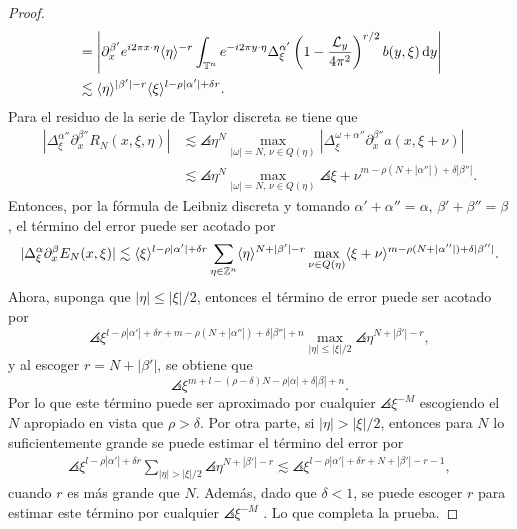 \begin{proof}
\begin{align*}
		& =  \left|\partial^{\beta'}_x  e^{i2\pi x\cdot\eta}\langle\eta\rangle^{-r}  \int_{\mathbb{T}^n} e^{-i2\pi y\cdot\eta}\Delta^{\alpha'}_\xi\left(1-\frac{\mathcal{L}_y}{4\pi^2}\right)^{r/2} b(y, \xi) \mathop{}\!\mathrm{d} y
		\right|\\
		& \lesssim \langle\eta\rangle^{|\beta'|-r} \langle\xi\rangle^{l-\rho|\alpha'|+\delta r}.
	\end{align*}
	Para el residuo de la serie de Taylor discreta se tiene que 
	\begin{align*}
		|\Delta^{\alpha''}_\xi\partial^{\beta''}_x R_N(x, \xi, \eta)| & \lesssim 
		\angles{\eta}^N \max_{|\omega|=N,\, \nu\in Q(\eta)} | \Delta^{\omega+\alpha''}_\xi\partial^{\beta''}_x a(x, \xi+\nu)|\\
		& \lesssim \angles{\eta}^N \max_{|\omega|=N,\, \nu\in Q(\eta)} \angles{\xi+\nu}^{m-\rho(N + |\alpha''|) + \delta|\beta''|}.
	\end{align*}
	Entonces, por la fórmula de Leibniz discreta y tomando $\alpha' + \alpha''=\alpha$, $\beta'+\beta''=\beta$, el término del error puede ser acotado por
	\begin{equation*}
		|\Delta^{\alpha}_\xi\partial^{\beta}_x E_N(x, \xi)| \lesssim 
		\langle\xi\rangle^{l-\rho|\alpha'|+\delta r} \sum_{\eta\in\mathbb{Z}^n} \langle\eta\rangle^{N+|\beta'|-r} \max_{\nu\in Q(\eta)}  \langle\xi+\nu\rangle^{m-\rho(N + |\alpha''|) + \delta|\beta''|}.
	\end{equation*}
	Ahora, suponga que $|\eta|\leq|\xi|/2$, entonces el término de error puede ser acotado por
	\begin{equation*}
		\angles{\xi}^{l-\rho|\alpha'|+\delta r+m-\rho(N + |\alpha''|) + \delta|\beta''|+n} \max_{|\eta|\leq|\xi|/2}\angles{\eta}^{N+|\beta'|-r},
	\end{equation*}
	y al escoger $r = N + |\beta'|$, se obtiene que
	\begin{equation*}
		\angles{\xi}^{m + l -(\rho-\delta)N -\rho|\alpha| + \delta|\beta| + n}.
	\end{equation*}
	Por lo que este término puede ser aproximado por cualquier $\angles{\xi}^{-M}$ escogiendo el $N$ apropiado en vista que $\rho>\delta$. Por otra parte, si $|\eta|>|\xi|/2$, entonces para $N$ lo suficientemente grande se puede estimar el término del error por 
	\begin{align*}
		\angles{\xi}^{l-\rho|\alpha'| + \delta r} \sum_{|\eta|>|\xi|/2} \angles{\eta}^{N+|\beta'|-r} \lesssim \angles{\xi}^{l-\rho|\alpha'| + \delta r+N+|\beta'|-r-1},
	\end{align*}
	cuando $r$ es más grande que $N$. Además, dado que $\delta<1$, se puede escoger $r$ para estimar este término por cualquier $\angles{\xi}^{-M}$ . Lo que completa la prueba.
\end{proof}
